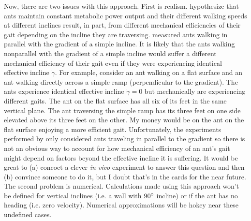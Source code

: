 \documentclass{article}
\begin{document}
Now, there are two issues with this approach.
First is realism.
\cite{Holt2012LocomotionTerrain} hypothesize that ants maintain constant metabolic power output and their different walking speeds at different inclines result, in part, from different mechanical efficiencies of their gait depending on the incline they are traversing.
\cite{Holt2012LocomotionTerrain} measured ants walking in parallel with the gradient of a simple incline.
It is likely that the ants walking nonparallel with the gradient of a simple incline would suffer a different mechanical efficiency of their gait even if they were experiencing identical effective incline $\dot{\gamma}$.
For example, consider an ant walking on a flat surface and an ant walking directly across a simple ramp (perpendicular to the gradient). 
The ants experience identical effective incline $\dot{\gamma} = 0$ but mechanically are experiencing different gaits.
The ant on the flat surface has all six of its feet in the same vertical plane.
The ant traversing the simple ramp has its three feet on one side elevated above its three feet on the other.
My money would be on the ant on the flat surface enjoying a more efficient gait.
Unfortunately, the experiments performed by \cite{Holt2012LocomotionTerrain} only considered ants traveling in parallel to the gradient so there is not an obvious way to account for how mechanical efficiency of an ant's gait might depend on factors beyond the effective incline it is suffering.
It would be great to (a) concoct a clever \textit{in vivo} experiment to answer this question and then (b) convince someone to do it, but I doubt that's in the cards for the near future.
The second problem is numerical.
Calculations made using this approach won't be defined for vertical inclines (i.e. a wall with $90 \degree$ incline) or if the ant has no heading (i.e. zero velocity).
Numerical approximations will be hokey near these undefined cases.
\end{document}
